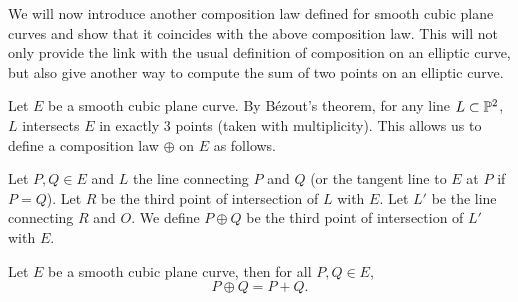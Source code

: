 
We will now introduce another composition law defined for smooth cubic plane
curves and show that it coincides with the above composition law.
This will not only provide the link with the usual definition of composition
on an elliptic curve, but also give another way to compute the sum
of two points on an elliptic curve.

Let $E$ be a smooth cubic plane curve.
By Bézout's theorem, for any line $L \subset \mathbb{P}^2$, $L$ intersects
$E$ in exactly 3 points (taken with multiplicity).
This allows us to define a composition law $\oplus$ on $E$ as
follows.

\begin{definition}
	\label{def:group-law}
	Let $P, Q \in E$ and $L$ the line connecting $P$ and $Q$ (or the tangent line
	to $E$ at $P$ if $P = Q$). Let $R$ be the third point of intersection of $L$
	with $E$. Let $L'$ be the line connecting $R$ and $O$. We define $P \oplus Q$
	be the third point of intersection of $L'$ with $E$.
\end{definition}


\begin{proposition}
	\label{prop:equivalence-composition}
	Let $E$ be a smooth cubic plane curve, then for all $P, Q \in E$,
	\begin{equation*}
		P \oplus Q = P + Q.
	\end{equation*}
\end{proposition}

